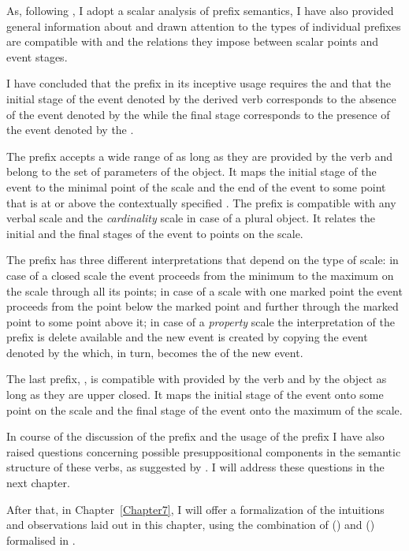 As, following \citet{Kagan:book}, I adopt a scalar analysis of prefix semantics, I have also provided general information about  and drawn attention to the types of  individual prefixes are compatible with and the relations they impose between scalar points and event stages. 

I have concluded that the prefix  in its inceptive usage requires the  and that the initial stage of the event denoted by the derived verb corresponds to the absence of the event denoted by the  while the final stage corresponds to the presence of the event denoted by the . 

The prefix  accepts a wide range of  as long as they are provided by the verb and belong to the set of parameters of the object. It maps the initial stage of the event to the minimal point of the scale and the end of the event to some point that is at or above the contextually specified . The prefix  is compatible with any verbal scale and the \textit{cardinality} scale in case of a plural object. It relates the initial and the final stages of the event to points on the scale. 

The prefix  has three different interpretations that depend on the type of scale: in case of a closed scale the event proceeds from the minimum to the maximum on the scale through all its points; in case of a scale with one marked point the event proceeds from the point below the marked point and further through the marked point to some point above it; in case of a \textit{property} scale the  interpretation of the prefix is delete available and the new event is created by copying the event denoted by the  which, in turn, becomes the  of the new event. 

The last prefix, , is compatible with  provided by the verb and by the object as long as they are upper closed. It maps the initial stage of the event onto some point on the scale and the final stage of the event onto the maximum of the scale. 

In course of the discussion of the prefix  and the  usage of the prefix  I have also raised questions concerning possible presuppositional components in the semantic structure of these verbs, as suggested by \citet{Kagan:book}. I will address these questions in the next chapter.

After that, in Chapter~\ref{Chapter7}, I will offer a formalization of the intuitions and observations laid out in this chapter, using the combination of  (\citealt{Fillmore:82}) and  (\citealt{JoshiSchabes:97}) formalised in \citealt{KallmeyerOsswald:13}. 

